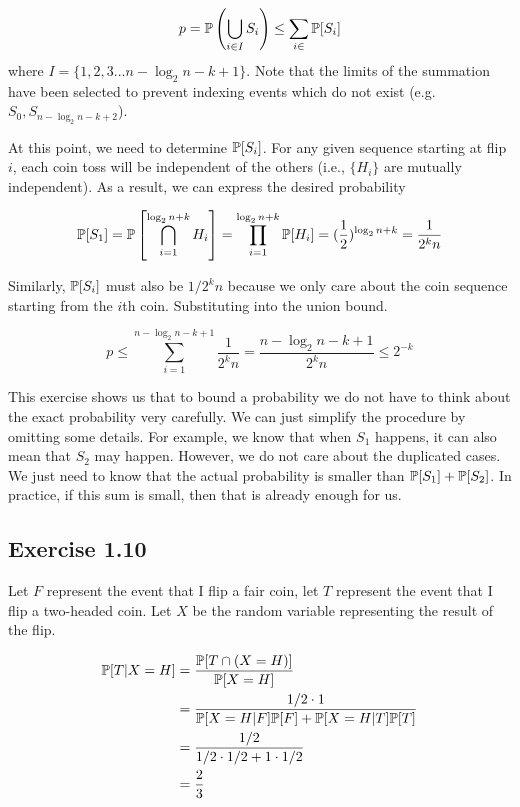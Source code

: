 \begin{equation*}
p = \P\left(\bigcup_{i \in I} S_i \right) \leq \sum_{i \in }\P[S_i]
\end{equation*}
where $I = \{1,2,3... n - \log_2 n - k + 1\}$. Note that the limits of the summation have been selected
to prevent indexing events which do not exist (e.g. $S_0, S_{n - \log_2 n - k + 2}$).

At this point, we need to determine $\P[S_i]$. For any given sequence starting at flip
$i$, each coin toss will be independent of the others (i.e., $\{H_i\}$ are mutually independent). As a result, we can
express the desired probability

\begin{equation*}
\P[S_1] = \P\left[\bigcap_{i=1}^{\log_2 n + k} H_i\right] = \prod_{i=1}^{\log_2 n + k} \P[H_i]
= (\frac{1}{2})^{\log_2 n + k} = \frac{1}{2^k n}
\end{equation*}

Similarly, $\P[S_i]$ must also be $1/2^k n$ because we only care about the coin sequence starting from
the $i$th coin. Substituting into the union bound.

\begin{equation*}
p \leq \sum_{i=1}^{n - \log_2 n - k + 1} \frac{1}{2^k n} = \frac{n - \log_2 n - k + 1}{2^k n} \leq 2^{-k}
\end{equation*}

\begin{remark}
	This exercise shows us that to bound a probability we do not have to think about the exact probability
	very carefully. We can just simplify the procedure by omitting some details. For example, we know that
	when $S_1$ happens, it can also mean that $S_2$ may happen. However, we do not care about the duplicated
	cases. We just need to know that the actual probability is smaller than $\P[S_1] + \P[S_2]$.
	In practice, if this sum is small, then that is already enough for us.
\end{remark}

\subsection*{Exercise 1.10}

Let $F$ represent the event that I flip a fair coin, let $T$ represent the event that I flip a two-headed coin.
Let $X$ be the random variable representing the result of the flip. 

\begin{equation*}
\begin{split}
\P[T | X = H] & = \frac{\P[T \cap (X = H)]}{\P[X = H]} \\
& = \frac{1/2 \cdot 1}{\P[X = H | F]\P[F] + \P[X = H | T]\P[T]} \\
& = \frac{1/2}{1/2 \cdot 1/2 + 1 \cdot 1/2} \\
& = \frac{2}{3}
\end{split}
\end{equation*}

